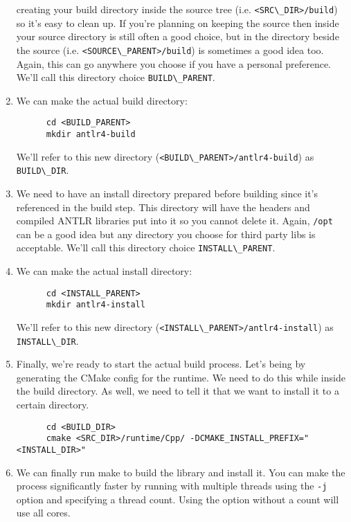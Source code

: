 \documentclass{article}
\begin{document}
\begin{enumerate}
    creating your build directory inside the source tree (i.e. \lstinline{<SRC\_DIR>/build}) so
    it's easy to clean up. If you're planning on keeping the source then inside your source
    directory is still often a good choice, but in the directory beside the source (i.e.
    \lstinline{<SOURCE\_PARENT>/build}) is sometimes a good idea too. Again, this can go anywhere
    you choose if you have a personal preference. We'll call this directory choice
    \lstinline{BUILD\_PARENT}.
  \item
    We can make the actual build directory:
    \begin{lstlisting}
      cd <BUILD_PARENT>
      mkdir antlr4-build
    \end{lstlisting}
    We'll refer to this new directory (\lstinline{<BUILD\_PARENT>/antlr4-build}) as
    \lstinline{BUILD\_DIR}.
  \item
    We need to have an install directory prepared before building since it's referenced in the
    build step. This directory will have the headers and compiled ANTLR libraries put into it so
    you cannot delete it. Again, \lstinline{/opt} can be a good idea but any directory you choose
    for third party libs is acceptable. We'll call this directory choice
    \lstinline{INSTALL\_PARENT}.
  \item
    We can make the actual install directory:
    \begin{lstlisting}
      cd <INSTALL_PARENT>
      mkdir antlr4-install
    \end{lstlisting}
    We'll refer to this new directory (\lstinline{<INSTALL\_PARENT>/antlr4-install}) as
    \lstinline{INSTALL\_DIR}.
  \item
    Finally, we're ready to start the actual build process. Let's being by generating the CMake
    config for the runtime. We need to do this while inside the build directory. As well, we need
    to tell it that we want to install it to a certain directory.
    \begin{lstlisting}
      cd <BUILD_DIR>
      cmake <SRC_DIR>/runtime/Cpp/ -DCMAKE_INSTALL_PREFIX="<INSTALL_DIR>"
    \end{lstlisting}
  \item
    We can finally run make to build the library and install it. You can make the process
    significantly faster by running with multiple threads using the \lstinline{-j} option and
    specifying a thread count. Using the option without a count will use all cores.
    \begin{lstlisting}

\end{lstlisting}
\end{enumerate}
\end{document}
